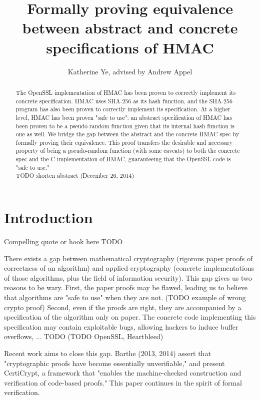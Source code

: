 \documentclass[twocolumn,showpacs,%
  nofootinbib,aps,superscriptaddress,%
  eqsecnum,prd,notitlepage,showkeys,10pt]{revtex4-1}
\begin{document}
\title{Formally proving equivalence between abstract and concrete specifications of HMAC}
\author{Katherine Ye, advised by Andrew Appel}

\begin{abstract}
The OpenSSL implementation of HMAC has been proven to correctly implement its concrete specification. HMAC uses SHA-256 as its hash function, and the SHA-256 program has also been proven to correctly implement its specification. At a higher level, HMAC has been proven "safe to use": an abstract specification of HMAC has been proven to be a pseudo-random function given that its internal hash function is one as well. We bridge the gap between the abstract and the concrete HMAC spec by formally proving their equivalence. This proof transfers the desirable and necessary property of being a pseudo-random function (with some caveats) to both the concrete spec and the C implementation of HMAC, guaranteeing that the OpenSSL code is "safe to use."
\\
TODO shorten abstract (December 26, 2014)

\end{abstract}

\maketitle

\section{Introduction}

Compelling quote or hook here TODO

There exists a gap between mathematical cryptography (rigorous paper proofs of correctness of an algorithm) and applied cryptography (concrete implementations of those algorithms, plus the field of information security). This gap gives us two reasons to be wary. First, the paper proofs may be flawed, leading us to believe that algorithms are "safe to use" when they are not. (TODO example of wrong crypto proof) Second, even if the proofs are right, they are accompanied by a specification of the algorithm only on paper. The concrete code implementing this specification may contain exploitable bugs, allowing hackers to induce buffer overflows, ... TODO (TODO OpenSSL, Heartbleed) 

Recent work aims to close this gap. Barthe (2013, 2014) assert that "cryptographic proofs have become essentially unverifiable," and present CertiCrypt, a framework that "enables the machine-checked
construction and verification of code-based proofs." This paper continues in the spirit of formal verification. 
\end{document}

